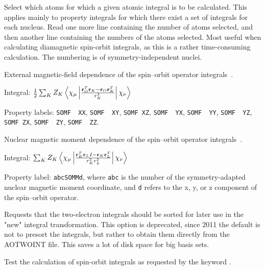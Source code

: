 \begin{description}
Select which atoms for which a given atomic integral is to be
calculated. This applies mainly to property integrals for which
there exist a set of integrals for each nucleus. Read one more line
containing the number of atoms selected, and then another line
containing the numbers of the atoms selected. Most useful when
calculating diamagnetic spin-orbit
integrals, as this is a rather time-consuming calculation. The
numbering is of symmetry-independent nuclei.

\item[\Key{SOFIEL}] External magnetic-field dependence of the spin--orbit
operator integrals~\cite{jvkrovjcp111}.

\begin{list}{}{}
\item Integral:
$\frac{1}{2}\sum_KZ_K\left<\chi_{\mu}\left|\frac{{\bf r}_O^T{\bf r}_K -
{\bf r}_O{\bf r}_K^T}{r_{K}^3}\right|\chi_{\nu}\right>$
\item Property labels: \verb|SOMF  XX|, \verb|SOMF  XY|, \verb|SOMF XZ|, 
\verb|SOMF  YX|, \verb|SOMF  YY|, \verb|SOMF  YZ|, \verb|SOMF ZX|, 
\verb|SOMF  ZY|, \verb|SOMF  ZZ|. 
\end{list}

\item[\Key{SOMAGM}] Nuclear magnetic moment dependence of the spin--orbit
operator integrals~\cite{jvkrovjcc20}.

\begin{list}{}{}
\item Integral: $\sum_KZ_K\left<\chi_{\mu}\left|\frac{{\bf r}_K^T{\bf r}_LI - {\bf r}_K{\bf r}_L^T}{r_K^3r_L^3}\right|\chi_{\nu}\right>$
\item Property label: \verb|abcSOMMd|, where \verb|abc| is the number
of the symmetry-adapted nuclear magnetic moment coordinate, and
\verb|d| refers to the x, y, or z component of the spin--orbit operator.
\end{list}

\item[\Key{SORT I}]\label{key:SORT_I} Requests that the
two-electron integrals should be sorted for later use in the "new"
integral transformation. This option is deprecated, since
2011 the default is not to presort the integrals, but rather to
obtain them directly from the AOTWOINT file. This saves a lot of disk
space for big basis sets.

\item[\Key{SOTEST}] Test the calculation of spin-orbit integrals as
requested by the keyword .


\end{description}

